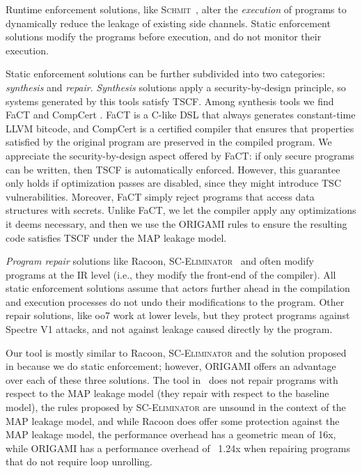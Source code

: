 Runtime enforcement solutions, like \textsc{Schmit}~\cite{Schmit}, alter the \emph{execution} of programs to dynamically reduce the leakage of existing side channels. Static enforcement solutions modify the programs before execution, and do not monitor their execution.

Static enforcement solutions can be further subdivided into two categories: \emph{synthesis} and \emph{repair}. \emph{Synthesis} solutions apply a security-by-design principle, so systems generated by this tools satisfy TSCF. Among synthesis tools we find FaCT \cite{FaCT} and CompCert \cite{CompCert}. 
FaCT is a C-like DSL that always generates constant-time LLVM bitcode, and CompCert is a certified compiler that ensures that properties satisfied by the original program are preserved in the compiled program. We appreciate the security-by-design aspect offered by FaCT: if only secure programs can be written, then TSCF is automatically enforced. However, this guarantee only holds if optimization passes are disabled, since they might introduce TSC vulnerabilities. Moreover, FaCT simply reject programs that access data structures with secrets. Unlike FaCT, we let the compiler apply any optimizations it deems necessary, and then we use the ORIGAMI rules to ensure the resulting code satisfies TSCF under the MAP leakage model. 

\emph{Program repair} solutions like Racoon\cite{Racoon}, \textsc{SC-Eliminator}~\cite{SCEliminator} and \cite{MSESC} often modify programs at the IR level (i.e., they modify the front-end of the compiler). All static enforcement solutions assume that actors further ahead in the compilation and execution processes do not undo their modifications to the program. Other repair solutions, like oo7 \cite{oo7} work at lower levels, but they protect programs against Spectre V1 attacks, and not against leakage caused directly by the program.

Our tool is mostly similar to Racoon, \textsc{SC-Eliminator} and the solution proposed in \cite{MSESC} because we do static enforcement; however, ORIGAMI offers an advantage over each of these three solutions. The tool in~\cite{MSESC} does not repair programs with respect to the MAP leakage model (they repair with respect to the baseline model), the rules proposed by \textsc{SC-Eliminator} are unsound in the context of the MAP leakage model, and while Racoon does offer some protection against the MAP leakage model, the performance overhead has a geometric mean of 16x, while ORIGAMI has a performance overhead of ~1.24x when repairing programs that do not require loop unrolling. 

